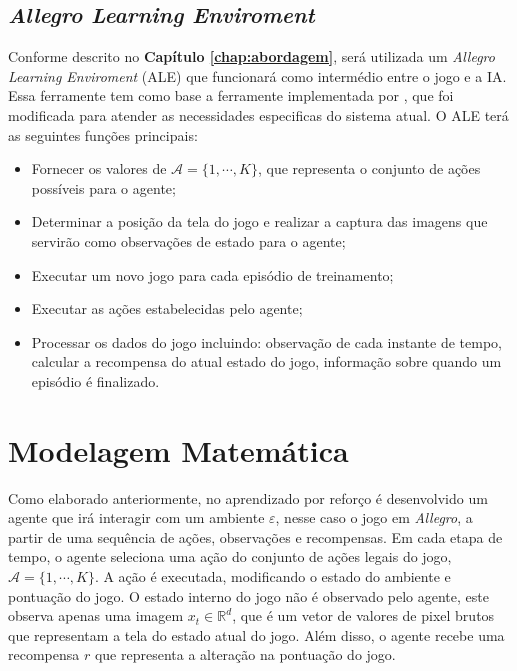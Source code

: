  
 \subsection{\textit{Allegro Learning Enviroment}} %
\label{sub:allegro_learning_enviroment}

Conforme descrito no \textbf{Capítulo \ref{chap:abordagem}}, será utilizada um \textit{Allegro Learning Enviroment} (ALE) que funcionará como intermédio entre o jogo e a IA. Essa ferramente tem como base a ferramente implementada por \cite{silva:amb-jd-allegro}, que foi modificada para atender as necessidades especificas do sistema atual. O ALE terá as seguintes funções principais:

\begin{itemize}
  \item Fornecer os valores de $\mathcal{A} = \{1,\cdots ,K\}$, que representa o conjunto de ações possíveis para o agente; 
  \item Determinar a posição da tela do jogo e realizar a captura das imagens que servirão como observações de estado para o agente;
  \item Executar um novo jogo para cada episódio de treinamento;
  \item Executar as ações estabelecidas pelo agente;
  \item Processar os dados do jogo incluindo: observação de cada instante de tempo, calcular a recompensa do atual estado do jogo, informação sobre quando um episódio é finalizado.
\end{itemize}



\section{Modelagem Matemática} %
\label{sec:modelagem_matematica}


Como elaborado anteriormente, no aprendizado por reforço é desenvolvido um agente que irá interagir com um ambiente $\varepsilon$, nesse caso o jogo em \textit{Allegro}, a partir de uma sequência de ações, observações e recompensas.
Em cada etapa de tempo, o agente seleciona uma ação do conjunto de ações legais do jogo, $\mathcal{A} = \{1,\cdots ,K\}$. A ação é executada, modificando o estado do ambiente e pontuação do jogo.
O estado interno do jogo não é observado pelo agente, este observa apenas uma imagem $x_t \in \mathbb{R}^d$, que é um vetor de valores de pixel brutos que representam a tela do estado atual do jogo. Além disso, o agente recebe uma recompensa $r$ que representa a alteração na pontuação do jogo.  

